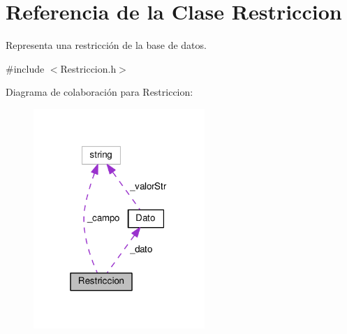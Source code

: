 \hypertarget{classRestriccion}{\section{Referencia de la Clase Restriccion}
\label{classRestriccion}
}


Representa una restricción de la base de datos.  




{\ttfamily \#include $<$Restriccion.\-h$>$}



Diagrama de colaboración para Restriccion\-:
\nopagebreak
\begin{figure}[H]
\begin{center}
\leavevmode
\includegraphics[width=184pt]{classRestriccion__coll__graph}
\end{center}
\end{figure}
